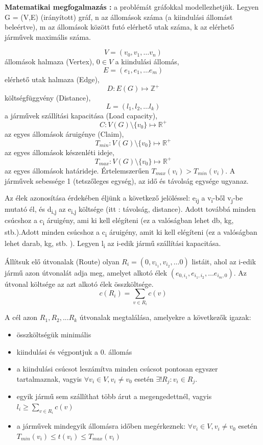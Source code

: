 \textbf{Matematikai megfogalmazás :} a problémát gráfokkal modellezhetjük.
\newline 
Legyen G = (V,E) (irányított) gráf, n az állomások száma (a kiindulási állomást beleértve), m az állomások között futó elérhető utak száma, k az elérhető járművek maximális száma.

\[ V = (v_0,v_1, \dots v_n )\]  állomások halmaza (Vertex), \(0 \in V\) a kiindulási állomás,
\[ E = (e_1,e_1, \dots e_m)\] elérhető utak halmaza (Edge),
\[ D : E(G) \mapsto \mathbb{Z}^+\] költségfüggvény (Distance),
\[ L = (l_1,l_2, \dots l_k)\] a járművek szállítási kapacitása (Load capacity),
\[ C : V(G)\setminus \{v_0\} \mapsto \mathbb{R}^+ \] az egyes állomások áruigénye (Claim),
\[ T_{min} :  V(G)\setminus \{v_0\} \mapsto \mathbb{R}^+ \] az egyes állomások készenléti ideje,
\[ T_{max} :  V(G)\setminus \{v_0\} \mapsto \mathbb{R}^+ \] az egyes állomások határideje. Értelemszerűen \(T_{max}(v_i) > T_{min}(v_i) \). A járművek sebessége 1 (tetszőleges egység), az idő és távolság egysége ugyanaz.

Az élek azonosítása érdekében éljünk a következő jelöléssel: e\textsubscript{ij} a v\textsubscript{i}-ből v\textsubscript{j}-be mutató él, és d\textsubscript{i,j} az e\textsubscript{i,j} költsége (itt : távolság, distance). Adott továbbá minden csúcshoz a c\textsubscript{i} áruigény, ami ki kell elégíteni (ez a valóságban lehet db, kg, stb.).Adott minden csúcshoz a c\textsubscript{i} áruigény, amit ki kell elégíteni (ez a valóságban lehet darab, kg, stb. ).  Legyen l\textsubscript{i} az i-edik jármű szállítási kapacitása.

Állítsuk elő útvonalak (Route) olyan \( R_{i} = (0, v_{i_1}, v_{i_2}, \dots 0) \) listáit,
ahol az i-edik jármű azon útvonalát adja meg, amelyet alkotó élek 
\( (e_{0,i_{1}}, e_{i_{1},i_{2}}, \dots e_{i_{m},0}) \). Az útvonal költsége az azt alkotó élek összköltsége. 
\begin{equation}
	c(R_i) = \sum_{v \in R_i} c(v)
\end{equation}


A cél azon \(R_1,R_2,...R_k \) útvonalak megtalálása, amelyekre a következők igazak:
\begin{itemize}
	\item összköltségük minimális
	\item kiindulási és végpontjuk a 0. állomás
	\item a kiindulási csúcsot leszámítva minden csúcsot pontosan egyszer tartalmaznak, vagyis \(\forall v_i \in V, v_i\ne v_0\) esetén \( \exists!R_j : v_i \in R_j \). 
	\item egyik jármű sem szállíthat több árut a megengedettnél, vagyis \(l_i \geqslant \sum_{v \in R_i} c(v) \)
	\item a járművek mindegyik állomásra időben megérkeznek: \(\forall v_i \in V, v_i\ne v_0\) esetén \( T_{min}(v_i) \leqslant t(v_i) \leqslant T_{max}(v_i) \)
\end{itemize}


